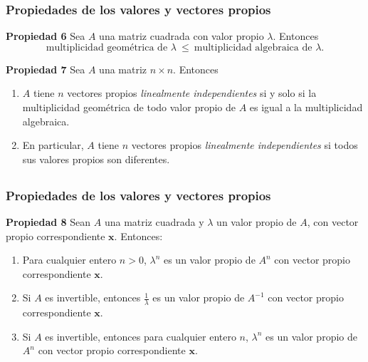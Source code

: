 \begin{frame}\frametitle{Propiedades de los valores y vectores propios}	

\begin{prop}{\textbf{Propiedad 6}}
	\justifying
	Sea $A$ una matriz cuadrada con valor propio $\lambda$. Entonces 
	\[
	\text{multiplicidad geométrica de } \lambda \ \leq \ \text{multiplicidad algebraica de } \lambda.
	\]
\end{prop}	

\begin{prop}{\textbf{Propiedad 7}}
	\justifying
	Sea $A$ una matriz $n\times n$. Entonces 
	\begin{enumerate}[$a$]\justifying
		\item $A$ tiene $n$ vectores propios \textit{linealmente independientes}
		si y solo si la multiplicidad geométrica de todo valor propio de $A$ es igual a la multiplicidad algebraica.
		\item En particular, $A$ tiene $n$ vectores propios \textit{linealmente independientes} si todos sus valores propios son diferentes.
	\end{enumerate}		
\end{prop}	

\end{frame}


\subsection{}

\begin{frame}\frametitle{Propiedades de los valores y vectores propios}

\begin{prop}{\textbf{Propiedad 8}}
	\justifying
	Sean $A$ una matriz cuadrada y $\lambda$ un valor propio de $A$, con vector propio correspondiente $\mathbf{x}$.
	Entonces:
	\begin{enumerate}[$a$]\justifying
		\item Para cualquier entero $n>0$, $\lambda^n$ es un valor propio de $A^n$ con vector propio correspondiente
		$\mathbf{x}$.
		\item Si $A$ es invertible, entonces $\frac{1}{\lambda}$ es un valor propio de $A^{-1}$ con vector propio correspondiente 
		$\mathbf{x}$.
		\item Si $A$ es invertible, entonces para cualquier entero $n$, $\lambda^n$ es un valor propio de $A^n$ con vector propio correspondiente
		$\mathbf{x}$.
	\end{enumerate}		
\end{prop}	

\end{frame}

